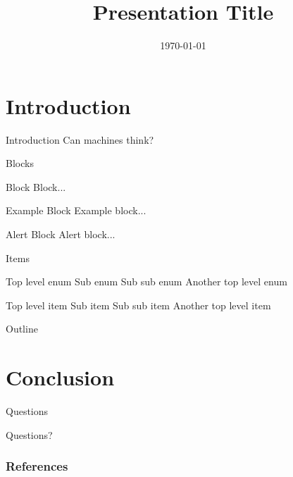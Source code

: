 \documentclass{beamer}
\title[Presentation]{Presentation Title}
\author[Dogan]
{%
  \texorpdfstring{
    \begin{columns}
      \column{.45\linewidth}
      \centering
      Haluk Dogan\\
      \url{https://haluk.github.io/}\\
      \href{mailto:hlk.dogan@gmail.com}{hlk.dogan@gmail.com}
    \end{columns}
}
{Dogan}
}
\institute[UNL] %
{
  Department of Computer Science\\
  University of Nebraska-Lincoln
}
\date[\today] %
{\today}
\begin{document}
\begin{frame}
  \titlepage
\end{frame}

\section{Introduction}
\begin{frame}{Introduction}
  Can machines think? \citep{turin1950imitation}
\end{frame}

\begin{frame}{Blocks}
  \begin{block}{Block}
    Block...
  \end{block}
  \begin{exampleblock}{Example Block}
    Example block...
  \end{exampleblock}
  \begin{alertblock}{Alert Block}
    Alert block...
  \end{alertblock}
\end{frame}

\begin{frame}{Items}
  \begin{outline}[enumerate]
    \1 Top level enum
    \2 Sub enum
    \3 Sub sub enum
    \1 Another top level enum
  \end{outline}

  \begin{outline}[itemize]
    \1 Top level item
    \2 Sub item
    \3 Sub sub item
    \1 Another top level item
  \end{outline}

\end{frame}

\begin{frame}{Outline}
  \tableofcontents
\end{frame}

\section{Conclusion}
\begin{frame}{Questions}
  \begin{center}
    \Huge{Questions?}
  \end{center}
\end{frame}
\begin{frame}[allowframebreaks]
        \frametitle{References}
        
        
\end{frame}
\end{document}
